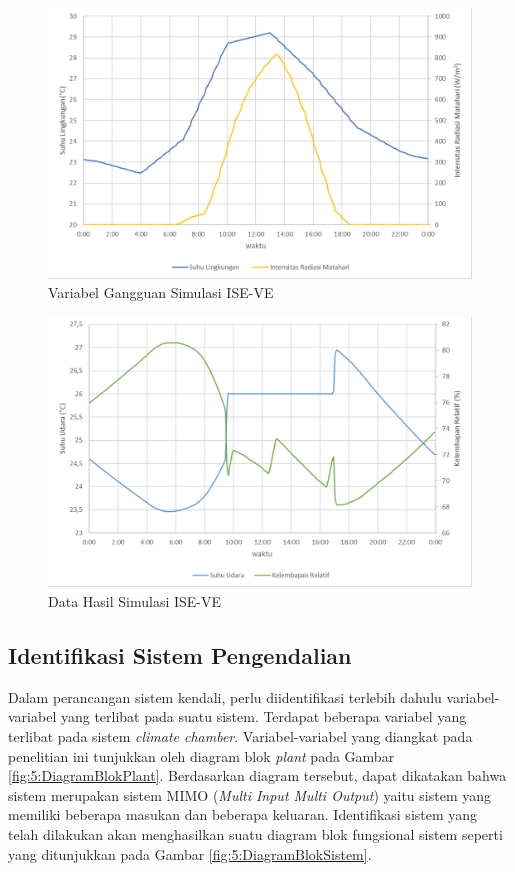 \begin{figure}[!h]
	\centering
	\includegraphics[width=1\textwidth]{figures/LoadSimulasiIESVE}
	\caption{Variabel Gangguan Simulasi ISE-VE}
	\label{fig:4:LoadSimulasiIESVE}
\end{figure}
\vspace{1em}
\hfill\break

\begin{figure}[!h]
	\centering
	\includegraphics[width=1\textwidth]{figures/HasilSimulasiIESVE}
	\caption{Data Hasil Simulasi ISE-VE}
	\label{fig:4:HasilSimulasiIESVE}
\end{figure}
\vspace{1em}
\break

\subsection{Identifikasi Sistem Pengendalian}

Dalam perancangan sistem kendali, perlu diidentifikasi terlebih dahulu variabel-variabel yang terlibat pada suatu sistem. Terdapat beberapa variabel yang terlibat pada sistem \textit{climate chamber}. Variabel-variabel yang diangkat pada penelitian ini tunjukkan oleh diagram blok \textit{plant} pada Gambar \ref{fig:5:DiagramBlokPlant}. Berdasarkan diagram tersebut, dapat dikatakan bahwa sistem merupakan sistem MIMO (\textit{Multi Input Multi Output}) yaitu sistem yang memiliki beberapa masukan dan beberapa keluaran. Identifikasi sistem yang telah dilakukan akan menghasilkan suatu diagram blok fungsional sistem seperti yang ditunjukkan pada Gambar \ref{fig:5:DiagramBlokSistem}.

